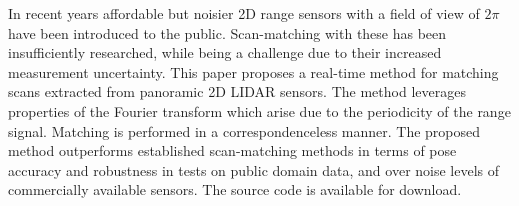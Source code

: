 In recent years affordable but noisier 2D range sensors with a field of view of
$2\pi$ have been introduced to the public. Scan-matching with these has been
insufficiently researched, while being a challenge due to their
increased measurement uncertainty. This paper proposes a real-time method for
matching scans extracted from panoramic 2D LIDAR sensors. The method leverages
properties of the Fourier transform which arise due to the periodicity of the
range signal. Matching is performed in a correspondenceless manner. The
proposed method outperforms established scan-matching methods in terms of pose
accuracy and robustness in tests on public domain data, and over noise
levels of commercially available sensors. The source code is available
for download.
